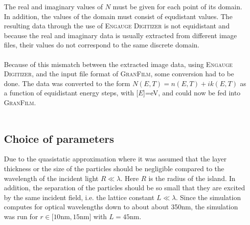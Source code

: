 The real and imaginary values of $N$ must be given for each point of its domain. In addition, the 
values of the domain must consist of equdistant values. The resulting data through the use of 
\textsc{Engauge Digitizer} is not equidistant and because the real and imaginary data is usually
extracted from different image files, their values do not correspond to the same discrete domain. 
\\
\\
Because of this mismatch between the extracted image data, using \textsc{Engauge Digitizer}, 
and the input file format of \textsc{GranFilm}, some conversion had to be done.
The data was converted to the form $N(E,T) = n(E,T) + ik(E,T)$ as a function of equidistant
energy steps, with [$E$]=eV, and could now be fed into \textsc{GranFilm}.
\\
\\


\subsection{Choice of parameters}
Due to the quasistatic approximation where it was assumed that the layer thickness or the size
of the particles should be negligible compared to the wavelength of the incident light $R \ll \lambda$. Here
$R$ is the radius of the island.
In addition, the separation of the particles should be so small that they are excited by the same incident
field, i.e. the lattice constant $L \ll \lambda$.
Since the simulation computes for optical wavelengths down to about about 350nm, the simulation
was run for $r \in [10$nm$,15$nm$]$ with $L = 45$nm.

